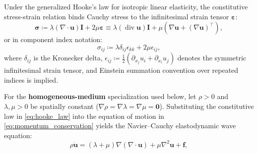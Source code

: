 Under the generalized Hooke's law for isotropic linear elasticity, the
constitutive stress-strain relation binds Cauchy stress to the
infinitesimal strain tensor $\bm{\varepsilon}$:
\begin{equation}
  \bm{\sigma} \coloneqq \lambda (\nabla \cdot \mathbf{u}) \mathbf{I} +
  2\mu \bm{\varepsilon} \equiv \lambda (\operatorname{div}
  \mathbf{u}) \mathbf{I} +
  \mu \left( \nabla \mathbf{u} + (\nabla \mathbf{u})^\top \right),
  \label{eq:hooke_law_tensor}
\end{equation}
or in component index notation:
\begin{equation}
  \sigma_{ij} \coloneqq \lambda \delta_{ij} \epsilon_{kk} + 2\mu \epsilon_{ij},
  \label{eq:hooke_law}
\end{equation}
where $\delta_{ij}$ is the Kronecker delta, $\epsilon_{ij} \coloneqq
\frac{1}{2}\left(\partial_{x_j} u_i + \partial_{x_i} u_j\right)$ denotes the
symmetric infinitesimal strain tensor, and Einstein summation convention over
repeated indices is implied.

For the \textbf{homogeneous-medium} specialization used below, let $\rho > 0$
and $\lambda,\mu > 0$ be spatially constant ($\nabla \rho = \nabla \lambda =
\nabla \mu = \mathbf{0}$). Substituting the constitutive law in
\cref{eq:hooke_law} into the equation of motion in
\cref{eq:momentum_conservation} yields the Navier--Cauchy elastodynamic wave
equation:
\begin{equation}
  \rho \ddot{\mathbf{u}} = (\lambda +
  \mu)\nabla(\nabla \cdot \mathbf{u}) + \mu \nabla^2 \mathbf{u} + \mathbf{f},
  \label{eq:navier_cauchy}
\end{equation}

